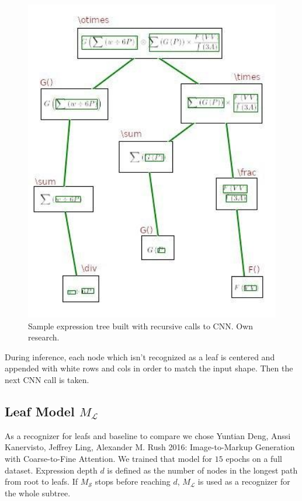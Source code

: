 \documentclass{sciposter}
\begin{document}
\begin{multicols}{3}
\begin{figure}[h]
\begin{center}
\includegraphics[width=16cm]{cnn.jpg}
\end{center}
\caption{ \label{fig:tree} Sample expression tree built with recursive calls to CNN. Own research.}
\end{figure}

During inference, each node which isn't recognized as a leaf is centered and appended with white rows and cols in order to match the input shape. Then the next CNN call is taken.

\subsection{Leaf Model $M_{\mathcal{L}}$}
As a recognizer for leafs and baseline to compare we chose Yuntian Deng, Anssi Kanervisto, Jeffrey Ling, Alexander M. Rush 2016: Image-to-Markup Generation with Coarse-to-Fine Attention. We trained that model for $15$ epochs on a full dataset. Expression depth $d$ is defined as the number of nodes in the longest path from root to leafs. If $M_{\mathcal{S}}$ stops before reaching $d$, $M_{\mathcal{L}}$ is used as a recognizer for the whole subtree.


\end{multicols}
\end{document}
